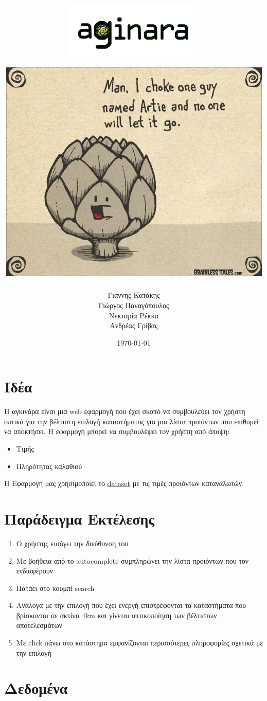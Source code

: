 \documentclass[a4paper,10pt]{report}
\title{
\vspace{-1cm}
\centering
\includegraphics[scale=0.8]{aginara-logo3.png}
\vspace{1cm}
\includegraphics[scale=0.6]{artichoke.jpg}
\vspace{0.5cm}
}
\author{Γιάννης Κατάκης \\Γιώργος Παναγόπουλος\\ Νεκταρία Ρέκκα\\Ανδρέας Γρίβας}
\date{\today}
\begin{document}
\maketitle
\tableofcontents

\newpage
\section{Ιδέα}
Η αγκινάρα είναι μια web εφαρμογή που έχει σκοπό να συμβουλεύει τον χρήστη οπτικά για την 
βέλτιστη επιλογή καταστήματος για μια λίστα
προιόντων που επιθυμεί να αποκτήσει. Η εφαρμογή μπορεί να συμβουλέψει τον χρήστη από άποψη: 
\begin{itemize}
 \item Τιμής
 \item Πληρότητας καλαθιού
\end{itemize}
Η Εφαρμογή μας χρησιμοποιεί το \href{http://www.data.gov.gr/dataset/17/}{dataset} με τις τιμές 
προιόντων καταναλωτών.

\section{Παράδειγμα Εκτέλεσης}

\begin{enumerate}
 \item Ο χρήστης εισάγει την διεύθυνση του
 \item Με βοήθεια από το autocomplete συμπληρώνει την λίστα προιόντων που τον ενδιαφέρουν
 \item Πατάει στο κουμπί search
 \item Ανάλογα με την επιλογή που έχει ενεργή επιστρέφονται τα καταστήματα που βρίσκονται σε ακτίνα
 4km και γίνεται οπτικοποίηση των βέλτιστων αποτελεσμάτων
 \item Με click πάνω στο κατάστημα εμφανίζονται περισσότερες πληροφορίες σχετικά με την επιλογή
\end{enumerate}

\section{Δεδομένα}
\end{document}
